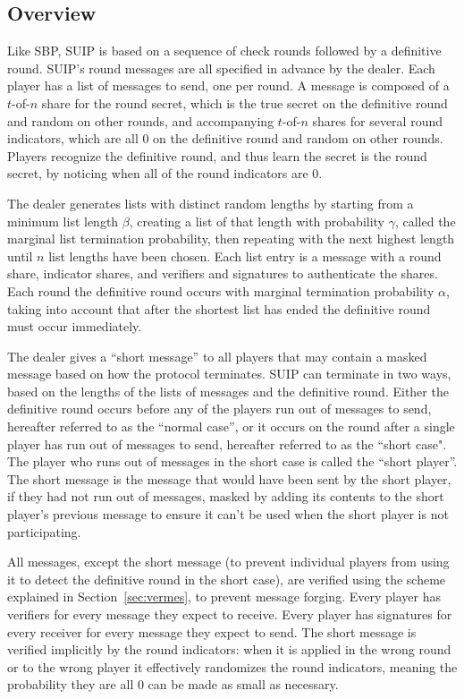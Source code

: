 \documentclass[12pt]{dalcsthesis}
\begin{document}
\subsection{Overview}

Like SBP, SUIP is based on a sequence of check rounds followed by a definitive round. SUIP's round messages are all specified in advance by the dealer. Each player has a list of messages to send, one per round. A message is composed of a $t$-of-$n$ share for the round secret, which is the true secret on the definitive round and random on other rounds, and accompanying $t$-of-$n$ shares for several round indicators, which are all 0 on the definitive round and random on other rounds. Players recognize the definitive round, and thus learn the secret is the round secret, by noticing when all of the round indicators are 0.

The dealer generates lists with distinct random lengths by starting from a minimum list length $\beta$, creating a list of that length with probability $\gamma$, called the marginal list termination probability, then repeating with the next highest length until $n$ list lengths have been chosen. Each list entry is a message with a round share, indicator shares, and verifiers and signatures to authenticate the shares. Each round the definitive round occurs with marginal termination probability $\alpha$, taking into account that after the shortest list has ended the definitive round must occur immediately.

The dealer gives a ``short message'' to all players that may contain a masked message based on how the protocol terminates. SUIP can terminate in two ways, based on the lengths of the lists of messages and the definitive round. Either the definitive round occurs before any of the players run out of messages to send, hereafter referred to as the ``normal case'', or it occurs on the round after a single player has run out of messages to send, hereafter referred to as the ``short case". The player who runs out of messages in the short case is called the ``short player''. The short message is the message that would have been sent by the short player, if they had not run out of messages, masked by adding its contents to the short player's previous message to ensure it can't be used when the short player is not participating.

All messages, except the short message (to prevent individual players from using it to detect the definitive round in the short case), are verified using the scheme explained in Section~\ref{sec:vermes}, to prevent message forging. Every player has verifiers for every message they expect to receive. Every player has signatures for every receiver for every message they expect to send. The short message is verified implicitly by the round indicators: when it is applied in the wrong round or to the wrong player it effectively randomizes the round indicators, meaning the probability they are all 0 can be made as small as necessary.
\end{document}
